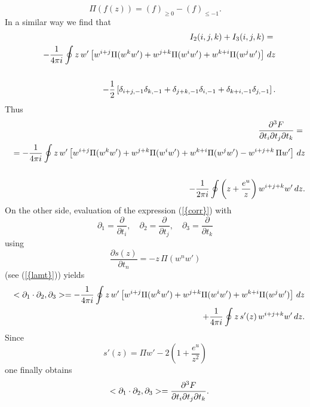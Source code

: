 \documentclass[numbook, envcountsame, envcountreset]{svjour3}
\begin{document}
\begin{equation}\label{pi}
\Pi\left( f(z)\right) =(f)_{\geq 0} -(f)_{\leq -1}.
\end{equation}
In a similar way we find that
\begin{eqnarray}
&&
I_2(i,j,k)+I_3(i,j,k)=
{\nonumber}\\
&& -\frac1{4\pi i} \oint z\,w'\left[ w^{i+j} \Pi(w^k w')
+w^{j+k} \Pi(w^i w') + w^{k+i} \Pi (w^j w')\right]\, dz
{\nonumber}\\
&&
{\nonumber}\\
&&
-\frac12 \left[ \delta_{i+j, -1}\delta_{k,-1} +\delta_{j+k,-1} \delta_{i,-1} +\delta_{k+i,-1} \delta_{j,-1}\right].
{\nonumber}
\end{eqnarray}
Thus
\begin{eqnarray}
&&
\frac{{\partial}^3F}{{\partial} t_i {\partial} t_j{\partial} t_k}=
{\nonumber}\\
&&
=-\frac1{4\pi i} \oint z\,w'\left[ w^{i+j} \Pi(w^k w')
+w^{j+k} \Pi(w^i w') + w^{k+i} \Pi (w^j w')- w^{i+j+k}\,\Pi w' \right]\, dz
{\nonumber}\\
&&
{\nonumber}\\
&&
-\frac1{2\pi i} \oint \left( z+\frac{e^u}{z}\right) w^{i+j+k} w'\, dz
.
{\nonumber}
\end{eqnarray}
On the other side, evaluation of the expression {(\ref{{corr}})} with
$$
{\partial}_1=\frac{\partial}{{\partial} t_i}, \quad {\partial}_2=\frac{\partial}{{\partial} t_j}, \quad {\partial}_3=\frac{\partial}{{\partial} t_k}
$$
using
$$
\frac{{\partial} s(z)}{{\partial} t_n} =-z\, \Pi (w^n w')
$$
(see {(\ref{{lamt}})}) yields
\begin{eqnarray}
&&
< {\partial}_1\cdot {\partial}_2, {\partial}_3> = -\frac1{4\pi i} \oint z\,w'\left[ w^{i+j} \Pi(w^k w')
+w^{j+k} \Pi(w^i w') + w^{k+i} \Pi (w^j w')\right]\, dz
{\nonumber}\\
&&
+\frac1{4\pi i} \oint z\,s'(z) \, w^{i+j+k} w'\, dz.
{\nonumber}
\end{eqnarray}
Since
$$
s'(z) = \Pi w' -2\left( 1+\frac{e^u}{z^2}\right)
$$
one finally obtains
\begin{eqnarray}
&&
< {\partial}_1\cdot {\partial}_2, {\partial}_3> =\frac{{\partial}^3 F}{{\partial} t_i {\partial} t_j {\partial} t_k}.
{\nonumber}
\end{eqnarray}
\end{document}
